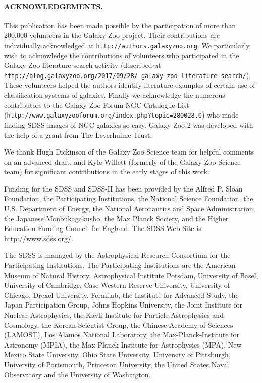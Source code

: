 \documentclass[usenatbib]{mn2e}
\begin{document}
\paragraph*{ACKNOWLEDGEMENTS.} 

This publication has been made possible by the participation of more than 200,000 volunteers in the Galaxy Zoo project. Their contributions are individually acknowledged at \texttt{http://authors.galaxyzoo.org}.  We particularly wish to acknowledge the contributions of volunteers who participated in the Galaxy Zoo literature search activity (described at {\tt http://blog.galaxyzoo.org/2017/09/28/ galaxy-zoo-literature-search/}). These volunteers helped the authors identify literature examples of certain use of classification systems of galaxies. Finally we acknowledge the numerous contributors to the Galaxy Zoo Forum NGC Catalogue List ({\tt http://www.galaxyzooforum.org/index.php?topic=280028.0}) who made finding SDSS images of NGC galaxies so easy. Galaxy Zoo 2 was developed with the help of a grant from The Leverhulme Trust.

We thank Hugh Dickinson of the Galaxy Zoo Science team for helpful comments on an advanced draft, and Kyle Willett (formerly of the Galaxy Zoo Science team) for significant contributions in the early stages of this work. 

Funding for the SDSS and SDSS-II has been provided by the Alfred P. Sloan Foundation, the Participating Institutions, the National Science Foundation, the U.S. Department of Energy, the National Aeronautics and Space Administration, the Japanese Monbukagakusho, the Max Planck Society, and the Higher Education Funding Council for England. The SDSS Web Site is http://www.sdss.org/. 

The SDSS is managed by the Astrophysical Research Consortium for the Participating Institutions. The Participating Institutions are the American Museum of Natural History, Astrophysical  Institute Potsdam, University of Basel, University of Cambridge, 
Case Western Reserve University, University of Chicago, Drexel University, Fermilab, the Institute for Advanced Study, the Japan 
Participation Group, Johns Hopkins University, the Joint Institute for Nuclear Astrophysics, the Kavli Institute for Particle Astrophysics and Cosmology, the Korean Scientist Group, the Chinese Academy of Sciences (LAMOST), Los Alamos National Laboratory, the Max-Planck-Institute for Astronomy (MPIA), the Max-Planck-Institute for Astrophysics (MPA), New Mexico State University, Ohio State University, University of Pittsburgh, University of Portsmouth, Princeton University, the United States Naval Observatory and the University of Washington. 

{}

\end{document}
